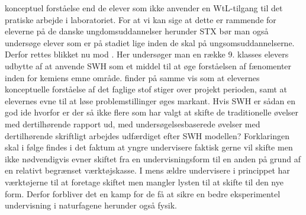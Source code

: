 konceptuel forståelse end de elever som ikke anvender en WtL-tilgang til det pratiske arbejde i laboratoriet. For at vi kan sige at dette er rammende for eleverne på de danske ungdomsuddannelser herunder STX bør man også undersøge elever som er på stadiet lige inden de skal på ungsomsuddannelserne. Derfor rettes blikket nu mod \citep{Kingir2013}. Her undersøger man en række 9. klasses elevers udbytte af at anvende SWH som et middel til at øge forståelsen af fænomenter inden for kemiens emne område. \citet{Kingir2013} finder på samme vis som \citet{Atasoy2013, Erkol2010} at elevernes konceptuelle forståelse af det faglige stof stiger over projekt perioden, samt at elevernes evne til at løse problemstillinger øges markant. Hvis SWH er sådan en god ide hvorfor er der så ikke flere som har valgt at skifte de traditionelle øvelser med dertilhørende rapport ud, med undersøgelsesbaserede øvelser med dertilhørende skriftligt arbejdes udfærdiget efter SWH modellen? Forklaringen skal i følge \citet{Burke2005,Keys1999,Krogh2016} findes i det faktum at yngre undervisere faktisk gerne vil skifte men ikke nødvendigvis evner skiftet fra en undervisningsform til en anden på grund af en relativt begrænset værktøjskasse. I mens ældre undervisere i princippet har værktøjerne til at foretage skiftet men mangler lysten til at skifte til den nye form. Derfor forbliver det en kamp for de få at sikre en bedre eksperimentel undervisning i naturfagene herunder også fysik.

